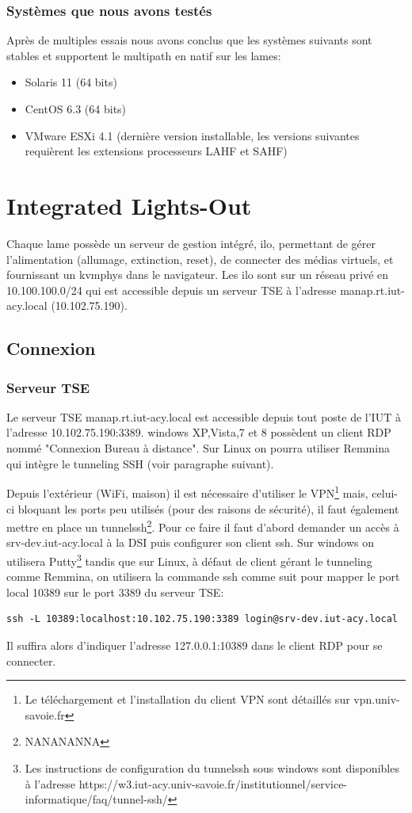 \documentclass[a4paper,oneside]{report}
\begin{document}
\subsubsection{Systèmes que nous avons testés}
Après de multiples essais nous avons conclus que les systèmes suivants sont stables et supportent le multipath en natif sur les lames:
\begin{itemize}
\item Solaris 11 (64 bits)
\item CentOS 6.3 (64 bits)
\item VMware ESXi 4.1 (dernière version installable, les versions suivantes requièrent les extensions processeurs LAHF et SAHF)
\end{itemize}

\section{Integrated Lights-Out}
Chaque lame possède un serveur de gestion intégré, \gls{ilo}, permettant de gérer l'alimentation (allumage, extinction, reset), de connecter des médias virtuels, et fournissant un \gls{kvmphys} dans le navigateur.
Les \gls{ilo} sont sur un réseau privé en 10.100.100.0/24 qui est accessible depuis un serveur TSE à l'adresse manap.rt.iut-acy.local (10.102.75.190).

\subsection{Connexion}
\subsubsection{Serveur TSE}
Le serveur TSE manap.rt.iut-acy.local est accessible depuis tout poste de l'IUT à l'adresse 10.102.75.190:3389. \gls{windows} XP,Vista,7 et 8 possèdent un client RDP nommé "Connexion Bureau à distance". Sur Linux on pourra utiliser Remmina qui intègre le tunneling SSH (voir paragraphe suivant).


Depuis l'extérieur (WiFi, maison) il est nécessaire d'utiliser le VPN\footnote{Le téléchargement et l'installation du client VPN sont détaillés sur vpn.univ-savoie.fr} mais, celui-ci bloquant les ports peu utilisés (pour des raisons de sécurité), il faut également mettre en place un \gls{tunnelssh}\footnote{NANANANNA}.
Pour ce faire il faut d'abord demander un accès à srv-dev.iut-acy.local à la DSI puis configurer son client \gls{ssh}.\newline
Sur \gls{windows} on utilisera Putty\footnote{Les instructions de configuration du \gls{tunnelssh} sous \gls{windows} sont disponibles à l'adresse https://w3.iut-acy.univ-savoie.fr/institutionnel/service-informatique/faq/tunnel-ssh/} tandis que sur Linux, à défaut de client gérant le tunneling comme Remmina, on utilisera la commande ssh comme suit pour mapper le port local 10389 sur le port 3389 du serveur TSE:
\label{tunnelingSsh}
\begin{verbatim}
ssh -L 10389:localhost:10.102.75.190:3389 login@srv-dev.iut-acy.local
\end{verbatim}
Il suffira alors d'indiquer l'adresse 127.0.0.1:10389 dans le client RDP pour se connecter.
\end{document}
